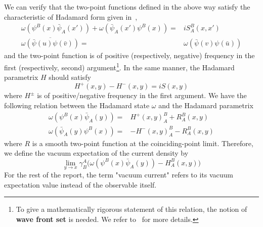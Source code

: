We can verify that the two-point functions defined in the above way satisfy the characteristic of Hadamard form given in~\cite{Radzikowski1996}, \ie
\begin{equation}\label{vacuum-hadamardcond}
\begin{split}
\omega(\psi^B(x)\bar{\psi}_A(x')) + \omega(\bar{\psi}_A(x')\psi^B(x)) = &
iS^B_A(x,x') \\
\overline{\omega(\bar{\psi}(u)\psi(\bar{v}))} = & \omega(\bar{\psi}(v)\psi(\bar{u}))
\end{split}
\end{equation}
and the two-point function is of positive (respectively, negative) frequency in the first (respectively, second) argument\footnote{
To give a mathematically rigorous statement of this relation, 
the notion of \textbf{wave front set} is needed. 
We refer to~\cite{Radzikowski1996} for more details.
}.
In the same manner, the Hadamard parametrix $H$ should satisfy
\begin{equation}\label{intro-hh}
H^+(x,y) - H^-(x,y) = i S(x,y)
\end{equation}
where $H^\pm$ is of positive/negative frequency in the first argument.
We have the following relation between the Hadamard state $\omega$ and the Hadamard parametrix
\begin{equation}\label{intro-renormalization}
\begin{split}
\omega(\psi^B(x)\bar{\psi}_A(y)) = & H^+(x,y)^B_A + R^B_A(x,y) \\
\omega(\bar{\psi}_A(y)\psi^B(x)) = &- H^-(x,y)^B_A - R^B_A(x,y)
\end{split}
\end{equation}
where $R$ is a smooth two-point function at the coinciding-point limit.
Therefore, 
we define the vacuum expectation of the current density by 
\begin{equation}\label{vacuum-currentexpression}
\lim_{y \rightarrow x} \gamma^A_B \big(
\omega(\psi^B(x)\bar{\psi}_A(y)) - H^B_A (x, y)\big)
\end{equation}
For the rest of the report, the term "vacuum current" refers to its vacuum expectation value instead of the observable itself. 
%
